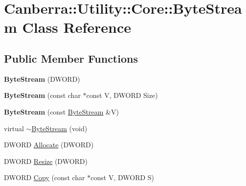 \hypertarget{class_canberra_1_1_utility_1_1_core_1_1_byte_stream}{}\section{Canberra\+:\+:Utility\+:\+:Core\+:\+:Byte\+Stream Class Reference}
\label{class_canberra_1_1_utility_1_1_core_1_1_byte_stream}
\subsection*{Public Member Functions}
\begin{DoxyCompactItemize}
\item 
\mbox{\label{class_canberra_1_1_utility_1_1_core_1_1_byte_stream_a8cbb287a0cbe76b7b5a16d0fafe1cff2}} 
{\bfseries Byte\+Stream} (D\+W\+O\+RD)
\item 
\mbox{\label{class_canberra_1_1_utility_1_1_core_1_1_byte_stream_a7374dbd8c0b1544a3d59fd7c0b9476d8}} 
{\bfseries Byte\+Stream} (const char $\ast$const V, D\+W\+O\+RD Size)
\item 
\mbox{\label{class_canberra_1_1_utility_1_1_core_1_1_byte_stream_ab5d1a44b718e367ffe5d16cbfa56aa30}} 
{\bfseries Byte\+Stream} (const \hyperlink{class_canberra_1_1_utility_1_1_core_1_1_byte_stream}{Byte\+Stream} \&V)
\item 
virtual \hyperlink{class_canberra_1_1_utility_1_1_core_1_1_byte_stream_ad560e08e58556b57190965b1c1a629d0_ad560e08e58556b57190965b1c1a629d0}{$\sim$\+Byte\+Stream} (void)
\item 
D\+W\+O\+RD \hyperlink{class_canberra_1_1_utility_1_1_core_1_1_byte_stream_a16ea976d5b995340125760f8571cc788_a16ea976d5b995340125760f8571cc788}{Allocate} (D\+W\+O\+RD)
\item 
D\+W\+O\+RD \hyperlink{class_canberra_1_1_utility_1_1_core_1_1_byte_stream_afbcb6de31f0f9b09ee532550c2be8bb7_afbcb6de31f0f9b09ee532550c2be8bb7}{Resize} (D\+W\+O\+RD)
\item 
D\+W\+O\+RD \hyperlink{class_canberra_1_1_utility_1_1_core_1_1_byte_stream_ac997ccc2337609abf0765ce17d474d22_ac997ccc2337609abf0765ce17d474d22}{Copy} (const char $\ast$const V, D\+W\+O\+RD S)
\item 

\end{DoxyCompactItemize}
